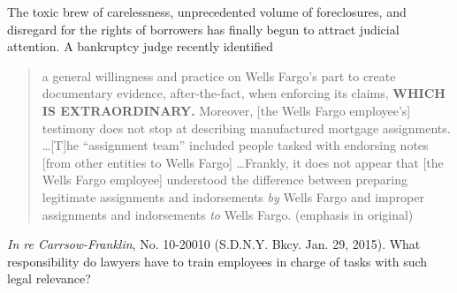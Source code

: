 \item The toxic brew of carelessness, unprecedented volume of foreclosures, and
disregard for the rights of borrowers has finally begun to attract judicial
attention. A bankruptcy judge recently identified
\begin{quote}
a general willingness and practice on Wells Fargo's part to create documentary
evidence, after-the-fact, when enforcing its claims, \textbf{WHICH IS
EXTRAORDINARY.} Moreover, [the Wells Fargo employee's] testimony does not stop
at describing manufactured mortgage assignments. \dots [T]he ``assignment
team'' included people tasked with endorsing notes [from other entities to
Wells Fargo] \dots Frankly, it does not appear that [the Wells Fargo employee]
understood the difference between preparing legitimate assignments and
indorsements \textit{by} Wells Fargo and improper assignments and indorsements
\textit{to} Wells Fargo. (emphasis in original)
\end{quote}
\emph{In re Carrsow-Franklin}, No. 10-20010 (S.D.N.Y. Bkcy. Jan. 29, 2015). What
responsibility do lawyers have to train employees in charge of tasks with such
legal relevance?

